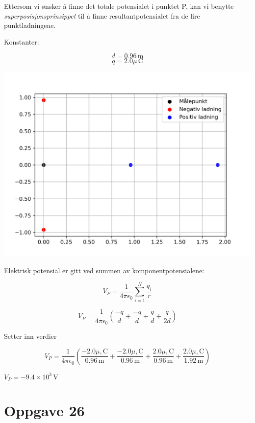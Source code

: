 \documentclass[a4paper,11pt]{article}
\begin{document}
\begin{minipage}{0.45\textwidth}
Ettersom vi ønsker å finne det totale potensialet i punktet P, kan vi benytte \textit{superposisjonsprinsippet} til å finne resultantpotensialet fra de fire punktladningene.

Konstanter:

$$d = 0.96\, \mathrm{m}$$
$$q = 2.0 \mu \, \mathrm{C}$$

\end{minipage}%
\begin{minipage}{0.55\textwidth}
  \includegraphics[width=\textwidth]{../oppgave_bilder/Oppgave19_17.png}
\end{minipage}

Elektrisk potensial er gitt ved summen av komponentpotensialene:

$$V_P = \frac{1}{4\pi\epsilon_0}\sum_{i=1}^{N}{\frac{q_i}{r}} $$

$$V_P = \frac{1}{4\pi\epsilon_0}\left(\frac{-q}{d} + \frac{-q}{d} + \frac{q}{d} + \frac{q}{2d}\right)$$

Setter inn verdier

$$V_P = \frac{1}{4\pi\epsilon_0}
\left(
\frac{-2.0\mu, \mathrm{C}}{0.96\, \mathrm{m}} + 
\frac{-2.0\mu, \mathrm{C}}{0.96\, \mathrm{m}} +
\frac{2.0\mu, \mathrm{C}}{0.96\, \mathrm{m}} +
\frac{2.0\mu, \mathrm{C}}{1.92\, \mathrm{m}}
\right)$$

\centerline{\underline{\underline{$V_P = -9.4 \times 10^{3}\, \mathrm{V}$}}}

\newpage
\section*{Oppgave 26}
\end{document}

